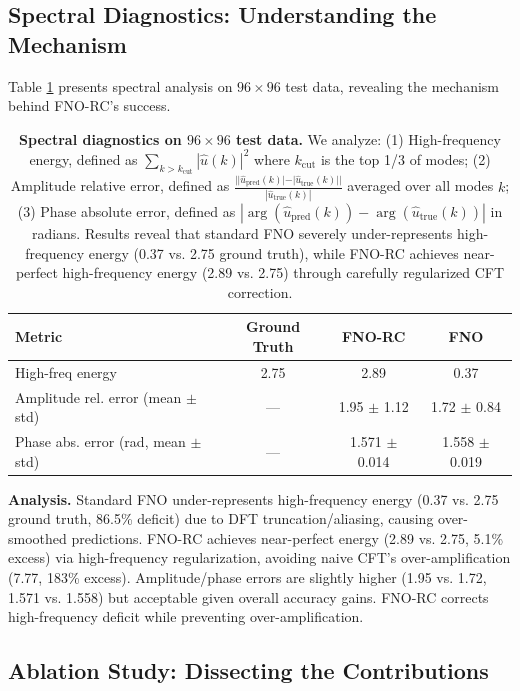 \documentclass[11pt]{article}
\begin{document}
\subsection{Spectral Diagnostics: Understanding the Mechanism}
\label{sec:spectral}

Table \ref{tab:spectrum} presents spectral analysis on $96 \times 96$ test data, revealing the mechanism behind FNO-RC's success.

\begin{table}[h]
\centering
\caption{\textbf{Spectral diagnostics on $96 \times 96$ test data.} We analyze: (1) High-frequency energy, defined as $\sum_{k > k_{\text{cut}}} |\hat{u}(k)|^2$ where $k_{\text{cut}}$ is the top 1/3 of modes; (2) Amplitude relative error, defined as $\frac{||\hat{u}_{\text{pred}}(k)| - |\hat{u}_{\text{true}}(k)||}{|\hat{u}_{\text{true}}(k)|}$ averaged over all modes $k$; (3) Phase absolute error, defined as $|\arg(\hat{u}_{\text{pred}}(k)) - \arg(\hat{u}_{\text{true}}(k))|$ in radians. Results reveal that standard FNO severely under-represents high-frequency energy (0.37 vs. 2.75 ground truth), while FNO-RC achieves near-perfect high-frequency energy (2.89 vs. 2.75) through carefully regularized CFT correction.}
\label{tab:spectrum}
\small
\begin{tabular}{@{}lccc@{}}
\toprule
\textbf{Metric} & \textbf{Ground Truth} & \textbf{FNO-RC} & \textbf{FNO} \\
\midrule
High-freq energy & 2.75 & 2.89 & 0.37 \\
Amplitude rel. error (mean $\pm$ std) & --- & 1.95 $\pm$ 1.12 & 1.72 $\pm$ 0.84 \\
Phase abs. error (rad, mean $\pm$ std) & --- & 1.571 $\pm$ 0.014 & 1.558 $\pm$ 0.019 \\
\bottomrule
\end{tabular}
\end{table}

\textbf{Analysis.} Standard FNO under-represents high-frequency energy (0.37 vs. 2.75 ground truth, 86.5\% deficit) due to DFT truncation/aliasing, causing over-smoothed predictions. FNO-RC achieves near-perfect energy (2.89 vs. 2.75, 5.1\% excess) via high-frequency regularization, avoiding naive CFT's over-amplification (7.77, 183\% excess). Amplitude/phase errors are slightly higher (1.95 vs. 1.72, 1.571 vs. 1.558) but acceptable given overall accuracy gains. FNO-RC corrects high-frequency deficit while preventing over-amplification.

\subsection{Ablation Study: Dissecting the Contributions}
\end{document}
